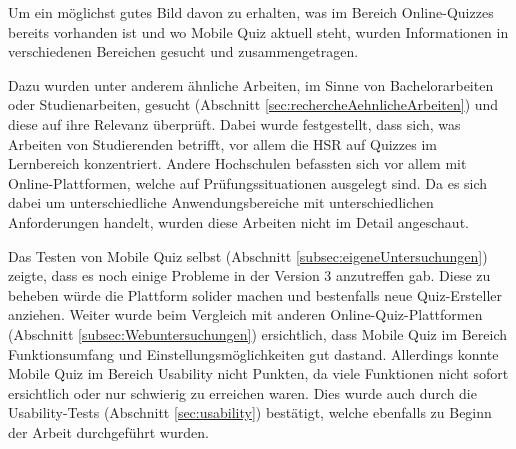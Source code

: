 








Um ein möglichst gutes Bild davon zu erhalten, was im Bereich Online-Quizzes bereits vorhanden ist und wo Mobile Quiz aktuell steht, wurden Informationen in verschiedenen Bereichen gesucht und zusammengetragen.

\bigskip

Dazu wurden unter anderem ähnliche Arbeiten, im Sinne von Bachelorarbeiten oder Studienarbeiten, gesucht (Abschnitt \ref{sec:rechercheAehnlicheArbeiten}) und diese auf ihre Relevanz überprüft. Dabei wurde festgestellt, dass sich, was Arbeiten von Studierenden betrifft, vor allem die HSR auf Quizzes im Lernbereich konzentriert. Andere Hochschulen befassten sich vor allem mit Online-Plattformen, welche auf Prüfungssituationen ausgelegt sind. Da es sich dabei um unterschiedliche Anwendungsbereiche mit unterschiedlichen Anforderungen handelt, wurden diese Arbeiten nicht im Detail angeschaut.

\bigskip

Das Testen von Mobile Quiz selbst (Abschnitt \ref{subsec:eigeneUntersuchungen}) zeigte, dass es noch einige Probleme in der Version 3 anzutreffen gab. Diese zu beheben würde die Plattform solider machen und bestenfalls neue Quiz-Ersteller anziehen.
Weiter wurde beim Vergleich mit anderen Online-Quiz-Plattformen (Abschnitt \ref{subsec:Webuntersuchungen}) ersichtlich, dass Mobile Quiz im Bereich Funktionsumfang und Einstellungsmöglichkeiten gut dastand. Allerdings konnte Mobile Quiz im Bereich Usability nicht Punkten, da viele Funktionen nicht sofort ersichtlich oder nur schwierig zu erreichen waren. Dies wurde auch durch die Usability-Tests (Abschnitt \ref{sec:usability}) bestätigt, welche ebenfalls zu Beginn der Arbeit durchgeführt wurden.

